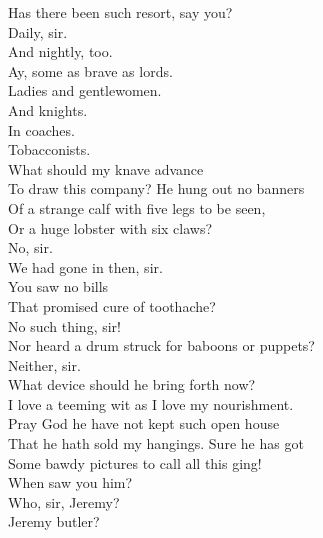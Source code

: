 \documentclass[a4paper,oneside,12pt]{memoir}
\begin{document}
\begin{drama*}
\lovewitspeaks Has there been such resort, say you?\\
\neighonespeaks {} Daily, sir.\\
\neightwospeaks And nightly, too.\\
\neighthreespeaks {} Ay, some as brave as lords.\\
\neighonespeaks Ladies and gentlewomen.\\
\neighthreespeaks {} And knights.\\
\neightwospeaks {} In coaches.\\
\neighonespeaks Tobacconists.\\
\lovewitspeaks {} What should my knave advance\\
To draw this company? He hung out no banners\\
Of a strange calf with five legs to be seen,\\
Or a huge lobster with six claws?\\
\neighthreespeaks {} No, sir.\\
\neightwospeaks We had gone in then, sir.\\
\lovewitspeaks {} You saw no bills\\
That promised cure of toothache?\\
\neightwospeaks {} No such thing, sir!\\
\lovewitspeaks Nor heard a drum struck for baboons or puppets?\\
\neighonespeaks Neither, sir.\\
\lovewitspeaks {} What device should he bring forth now?\\
I love a teeming wit as I love my nourishment.\\
Pray God he have not kept such open house\\
That he hath sold my hangings. Sure he has got\\
Some bawdy pictures to call all this ging!\\
When saw you him?\\
\neighonespeaks {} Who, sir, Jeremy?\\
\neightwospeaks {} Jeremy butler?\\

\end{drama*}
\end{document}
